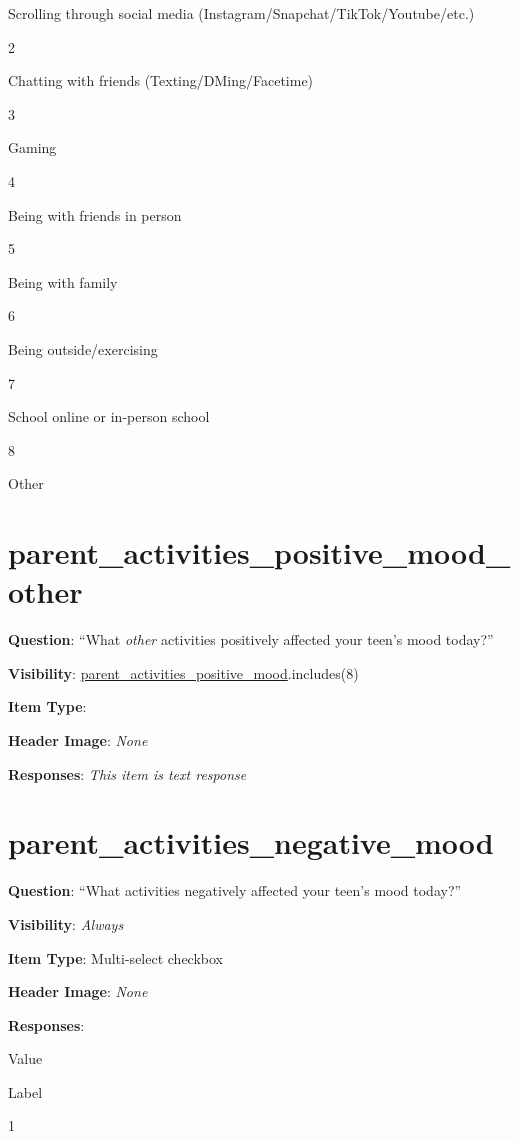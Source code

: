 \documentclass[]{book}
\begin{document}
Scrolling through social media (Instagram/Snapchat/TikTok/Youtube/etc.)

2

Chatting with friends (Texting/DMing/Facetime)

3

Gaming

4

Being with friends in person

5

Being with family

6

Being outside/exercising

7

School online or in-person school

8

Other

\hypertarget{parent_activities_positive_mood_other}{%
\section{parent\_activities\_positive\_mood\_other}\label{parent_activities_positive_mood_other}}

\textbf{Question}: ``What \emph{other} activities positively affected your teen's mood today?''

\textbf{Visibility}: \protect\hyperlink{parent_activities_positive_mood}{parent\_activities\_positive\_mood}.includes(8)

\textbf{Item Type}:

\textbf{Header Image}: \emph{None}

\textbf{Responses}: \emph{This item is text response}

\hypertarget{parent_activities_negative_mood}{%
\section{parent\_activities\_negative\_mood}\label{parent_activities_negative_mood}}

\textbf{Question}: ``What activities negatively affected your teen's mood today?''

\textbf{Visibility}: \emph{Always}

\textbf{Item Type}: Multi-select checkbox

\textbf{Header Image}: \emph{None}

\textbf{Responses}:

Value

Label

1
\end{document}
